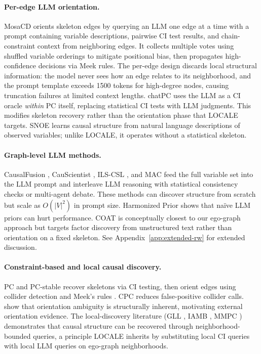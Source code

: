 \documentclass{article}
\begin{document}
\paragraph{Per-edge LLM orientation.}
MosaCD \citep{chen2024mosacd} orients skeleton edges by querying an LLM one edge at a time with a prompt containing variable descriptions, pairwise CI test results, and chain-constraint context from neighboring edges. It collects multiple votes using shuffled variable orderings to mitigate positional bias, then propagates high-confidence decisions via Meek rules. The per-edge design discards local structural information: the model never sees how an edge relates to its neighborhood, and the prompt template exceeds 1500 tokens for high-degree nodes, causing truncation failures at limited context lengths. chatPC \citep{ban2023chatpc} uses the LLM as a CI oracle \textit{within} PC itself, replacing statistical CI tests with LLM judgments. This modifies skeleton recovery rather than the orientation phase that LOCALE targets. SNOE \citep{snoe2025} learns causal structure from natural language descriptions of observed variables; unlike LOCALE, it operates without a statistical skeleton.

\paragraph{Graph-level LLM methods.}
CausalFusion \citep{takayama2024causalfusion}, CauScientist \citep{chen2025causcientist}, ILS-CSL \citep{gao2024ilscsl}, and MAC \citep{chen2024mac} feed the full variable set into the LLM prompt and interleave LLM reasoning with statistical consistency checks or multi-agent debate. These methods can discover structure from scratch but scale as $O(|V|^2)$ in prompt size. Harmonized Prior \citep{li2025harmonized} shows that na\"ive LLM priors can hurt performance. COAT \citep{jin2025coat} is conceptually closest to our ego-graph approach but targets factor discovery from unstructured text rather than orientation on a fixed skeleton. See Appendix~\ref{app:extended-rw} for extended discussion.

\paragraph{Constraint-based and local causal discovery.}
PC \citep{spirtes2000causation} and PC-stable \citep{colombo2014order} recover skeletons via CI testing, then orient edges using collider detection and Meek's rules \citep{meek1995causal}. CPC \citep{ramsey2006cpc} reduces false-positive collider calls. \citet{uhler2013geometry} show that orientation ambiguity is structurally inherent, motivating external orientation evidence. The local-discovery literature (GLL \citep{margaritis2000gll}, IAMB \citep{tsamardinos2003iamb}, MMPC \citep{tsamardinos2006mmpc}) demonstrates that causal structure can be recovered through neighborhood-bounded queries, a principle LOCALE inherits by substituting local CI queries with local LLM queries on ego-graph neighborhoods.
\end{document}
